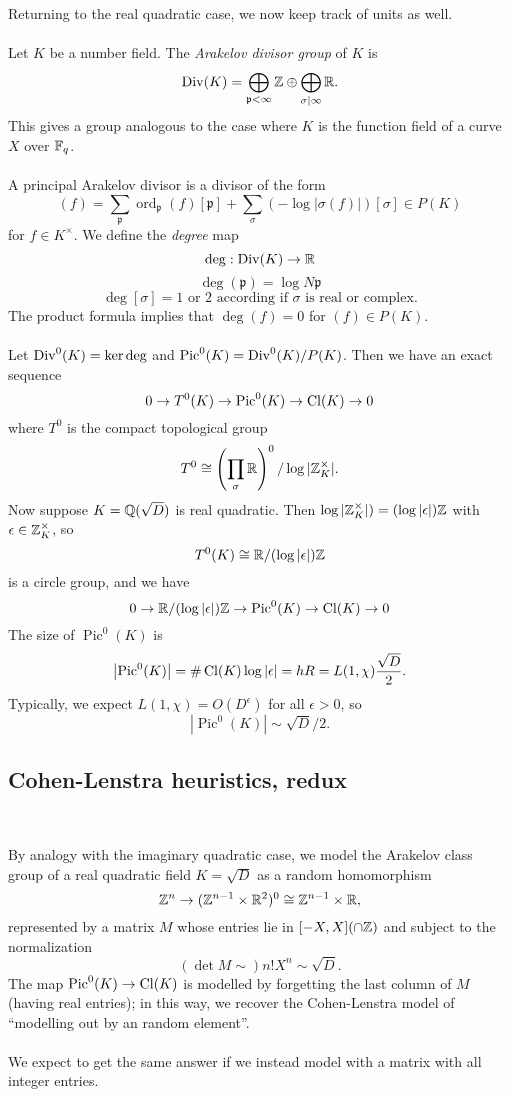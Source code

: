 \documentclass[12pt,amsfont]{amsart}
\begin{document}
Returning to the real quadratic case, we now keep track of units as well. \\ \\
Let $K$ be a number field. The \emph{Arakelov divisor group} of $K$ is
\[ \operatorname{Div}(K) = \bigoplus_{\mathfrak{p} < \infty} {\mathbb Z} \oplus \bigoplus_{\sigma | \infty} {\mathbb R}. \]
This gives a group analogous to the case where $K$ is the function field of a curve $X$ over ${\mathbb F}_q$. \\ \\
A principal Arakelov divisor is a divisor of the form
\[(f) = \sum_{\mathfrak{p}} \operatorname{ord}_{\mathfrak{p}}(f) [\mathfrak{p}] + \sum_\sigma (-\log |\sigma(f)|)[\sigma] \in P(K) \]
for $f \in K^\times$. We define the \emph{degree} map
\[ \deg: \operatorname{Div}(K) \rightarrow {\mathbb R}\]
\[\deg(\mathfrak{p}) = \log N \mathfrak{p} \]
\[\deg[\sigma] = 1 \text{ or } 2 \text{ according if } \sigma \text{ is real or complex}. \]
The product formula implies that $\deg(f) = 0$ for $(f) \in P(K)$. \\ \\
Let $\operatorname{Div}^0(K) = \ker \deg$ and $\operatorname{Pic}^0(K) = \operatorname{Div}^0(K)/P(K)$. Then we have an exact sequence
\[0 \rightarrow T^0(K) \rightarrow \operatorname{Pic}^0(K) \rightarrow \operatorname{Cl}(K) \rightarrow 0 \]
where $T^0$ is the compact topological group
\[T^0 \cong \left(\prod_{\sigma} {\mathbb R} \right)^0 / \log |{\mathbb Z}_K^\times|.\]
Now suppose $K = {\mathbb Q}(\sqrt{D})$ is real quadratic. Then $\log |{\mathbb Z}_K^\times|) = (\log |\epsilon|) {\mathbb Z}$ with $\epsilon \in {\mathbb Z}_K^\times$, so
\[ T^0(K) \cong {\mathbb R}/(\log |\epsilon|) {\mathbb Z} \]
is a circle group, and we have
\[0 \rightarrow {\mathbb R}/(\log |\epsilon|) {\mathbb Z} \rightarrow \operatorname{Pic}^0(K) \rightarrow \operatorname{Cl}(K) \rightarrow 0 \]
The size of $\operatorname{Pic}^0(K)$ is 
\[\left \lvert \operatorname{Pic}^0(K) \right \rvert = \# \operatorname{Cl}(K) \log |\epsilon| = hR = L(1, \chi) \frac{\sqrt{D}}{2}.\]
Typically, we expect $L(1, \chi) = O(D^\epsilon)$ for all $\epsilon > 0$, so
\[\left \lvert \operatorname{Pic}^0(K) \right \rvert \sim \sqrt{D}/2.\]
\subsection{Cohen-Lenstra heuristics, redux}
{\ }

By analogy with the imaginary quadratic case, we model the Arakelov class group of a real quadratic field $K = \sqrt{D}$ as a random homomorphism 
\[ {\mathbb Z}^n \rightarrow ({\mathbb Z}^{n-1} \times {\mathbb R}^2)^0 \cong {\mathbb Z}^{n-1} \times {\mathbb R}, \]
represented by a matrix $M$ whose entries lie in $[-X,X](\cap {\mathbb Z})$ and subject to the normalization
\[ (\det M \sim) n! X^n \sim \sqrt{D}. \]
The map $\operatorname{Pic}^0(K) \rightarrow \operatorname{Cl}(K)$ is modelled by forgetting the last column of $M$ (having real entries); in this way, we recover the Cohen-Lenstra model of ``modelling out by an random element''. \\ \\ 
We expect to get the same answer if we instead model with a matrix with all integer entries. 
\end{document}
